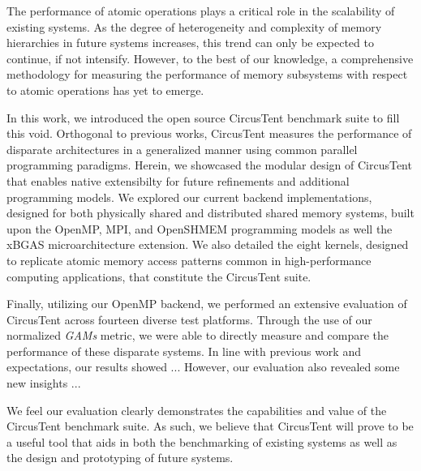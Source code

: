 
The performance of atomic operations plays a critical role in the scalability of existing systems.
As the degree of heterogeneity and complexity of memory hierarchies in future systems increases, this trend can only be expected to continue, if not intensify.
However, to the best of our knowledge, a comprehensive methodology for measuring the performance of memory subsystems with respect to atomic operations has yet to emerge.

In this work, we introduced the open source CircusTent benchmark suite to fill this void.
Orthogonal to previous works, CircusTent measures the performance of disparate architectures in a generalized manner using common parallel programming paradigms.
Herein, we showcased the modular design of CircusTent that enables native extensibilty for future refinements and additional programming models.
We explored our current backend implementations, designed for both physically shared and distributed shared memory systems, built upon the OpenMP, MPI, and OpenSHMEM programming models as well the xBGAS microarchitecture extension.
We also detailed the eight kernels, designed to replicate atomic memory access patterns common in high-performance computing applications, that constitute the CircusTent suite.

Finally, utilizing our OpenMP backend, we performed an extensive evaluation of CircusTent across fourteen diverse test platforms.
Through the use of our normalized \textit{GAMs} metric, we were able to directly measure and compare the performance of these disparate systems.
In line with previous work and expectations, our results showed ...
However, our evaluation also revealed some new insights ...

We feel our evaluation clearly demonstrates the capabilities and value of the CircusTent benchmark suite.
As such, we believe that CircusTent will prove to be a useful tool that aids in both the benchmarking of existing systems as well as the design and prototyping of future systems.

